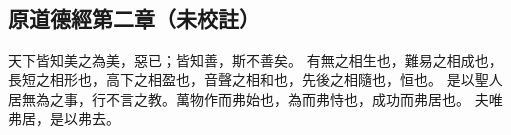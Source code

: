 ﻿%
%

\chapter{~}

\section{原道德經第二章（未校註）}

\begin{withgezhu}

\zhsong


\textcolor{tongjia-color}{天下皆知美之為美，惡已}；皆知善，斯不善矣。
有無之相生也，難易之相成也，長短之相形也，高下之相盈也，音聲之相和也，先後之相隨也，恒也。
是以聖人居無為之事，行不言之教。\textcolor{tongjia-color}{萬物作而弗始也}，為而弗恃也，成功而弗居也。
\textcolor{tongjia-color}{夫唯弗居}，是以弗去。

\end{withgezhu}
